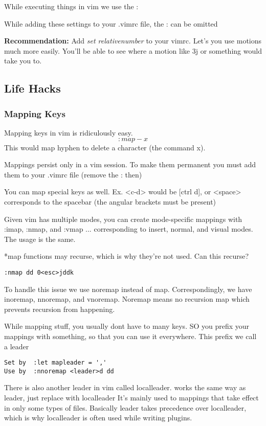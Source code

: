 \documentclass[12pt, letterpaper]{article}
\begin{document}
While executing things in vim we use the :

While adding these settings to your .vimrc file, the : can be omitted

\textbf{Recommendation:} Add \textit{set relativenumber} to your vimrc. Let's you use motions much more easily. You'll be able to see where a motion like 3j or something would take you to.

\subsection{Life Hacks}
\subsubsection{Mapping Keys}

Mapping keys in vim is ridiculously easy.
$$:map - x$$
This would map hyphen to delete a character (the command x).

Mappings persist only in a vim session. To make them permanent you must add them to your .vimrc file (remove the : then)

You can map special keys as well. Ex. <c-d> would be [ctrl d], or <space> corresponds to the spacebar (the angular brackets must be present)

Given vim has multiple modes, you can create mode-specific mappings with :imap, :nmap, and :vmap ... corresponding to insert, normal, and visual modes. The usage is the same.


*map functions may recurse, which is why they're not used. Can this recurse?
\begin{verbatim}
:nmap dd 0<esc>jddk
\end{verbatim}


To handle this issue we use noremap instead of map. Correspondingly, we have inoremap, nnoremap, and vnoremap. Noremap means no recursion map which prevents recursion from happening.


While mapping stuff, you usually dont have to many keys. SO you prefix your mappings with something, so that you can use it everywhere. This prefix we call a leader

\begin{verbatim}
Set by  :let mapleader = ','
Use by  :nnoremap <leader>d dd
\end{verbatim}

There is also another leader in vim called localleader.
works the same way as leader, just replace with localleader
It's mainly used to mappings that take effect in only some types of files. Basically leader takes precedence over localleader, which is why localleader is often used while writing plugins.
\end{document}
